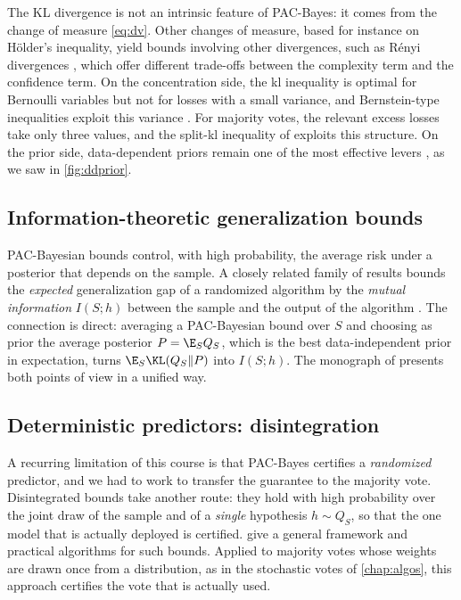 The KL divergence is not an intrinsic feature of PAC-Bayes: it comes from the
change of measure \eqref{eq:dv}. Other changes of measure, based for instance
on Hölder's inequality, yield bounds involving other divergences, such as Rényi
divergences \citep{begin2016pac}, which offer different trade-offs between the
complexity term and the confidence term. On the concentration side, the kl inequality is optimal
for Bernoulli variables but not for losses with a small variance, and
Bernstein-type inequalities exploit this variance
\citep{tolstikhin2013pac,mhammedi2019pac}. For majority votes, the relevant
excess losses take only three values, and the split-kl inequality of
\citet{wu2022split} exploits this structure. On the prior side, data-dependent
priors remain one of the most effective levers
\citep{parrado2012pac,dziugaite2018data,perez2021tighter}, as we saw in
\cref{fig:ddprior}.

\subsection{Information-theoretic generalization bounds}

PAC-Bayesian bounds control, with high probability, the average risk under a
posterior that depends on the sample. A closely related family of results
bounds the \emph{expected} generalization gap of a randomized algorithm by the
\emph{mutual information} $I(S;h)$ between the sample and the output of the
algorithm \citep{xu2017information}. The connection is direct: averaging a
PAC-Bayesian bound over $S$ and choosing as prior the average posterior
$P=\E_SQ_S$, which is the best data-independent prior in expectation, turns
$\E_S\KL(Q_S\|P)$ into $I(S;h)$. The monograph of \citet{hellstrom2025generalization}
presents both points of view in a unified way.

\subsection{Deterministic predictors: disintegration}

A recurring limitation of this course is that PAC-Bayes certifies a
\emph{randomized} predictor, and we had to work to transfer the guarantee to the
majority vote. Disintegrated bounds \citep{blanchard2007occam,rivasplata2020pac}
take another route: they hold with high probability over the joint draw of the
sample and of a \emph{single} hypothesis $h\sim Q_S$, so that the one model that
is actually deployed is certified. \citet{viallard2024general} give a general
framework and practical algorithms for such bounds. Applied to majority votes whose
weights are drawn once from a distribution, as in the stochastic votes of
\cref{chap:algos}, this approach certifies the vote that is actually used.

